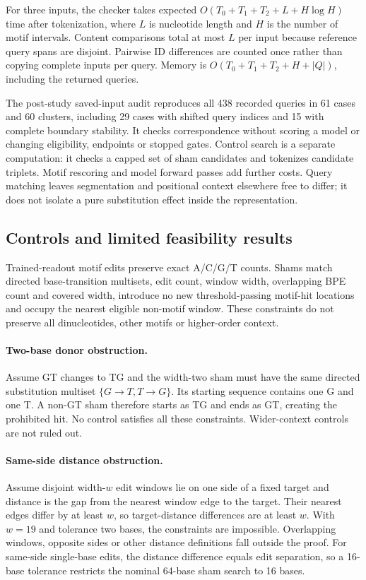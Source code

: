 \documentclass[10pt,letterpaper]{article}
\begin{document}
For three inputs, the checker takes expected $O(T_0+T_1+T_2+L+H\log H)$ time after tokenization, where $L$ is nucleotide length and $H$ is the number of motif intervals. Content comparisons total at most $L$ per input because reference query spans are disjoint. Pairwise ID differences are counted once rather than copying complete inputs per query. Memory is $O(T_0+T_1+T_2+H+|Q|)$, including the returned queries.

The post-study saved-input audit reproduces all 438 recorded queries in 61 cases and 60 clusters, including 29 cases with shifted query indices and 15 with complete boundary stability. It checks correspondence without scoring a model or changing eligibility, endpoints or stopped gates. Control search is a separate computation: it checks a capped set of sham candidates and tokenizes candidate triplets. Motif rescoring and model forward passes add further costs. Query matching leaves segmentation and positional context elsewhere free to differ; it does not isolate a pure substitution effect inside the representation.
\subsection{Controls and limited feasibility results}
Trained-readout motif edits preserve exact A/C/G/T counts. Shams match directed base-transition multisets, edit count, window width, overlapping BPE count and covered width, introduce no new threshold-passing motif-hit locations and occupy the nearest eligible non-motif window. These constraints do not preserve all dinucleotides, other motifs or higher-order context.

\paragraph{Two-base donor obstruction.}
Assume GT changes to TG and the width-two sham must have the same directed substitution multiset $\{G\!\to\!T,T\!\to\!G\}$. Its starting sequence contains one G and one T. A non-GT sham therefore starts as TG and ends as GT, creating the prohibited hit. No control satisfies all these constraints. Wider-context controls are not ruled out.

\paragraph{Same-side distance obstruction.}
Assume disjoint width-$w$ edit windows lie on one side of a fixed target and distance is the gap from the nearest window edge to the target. Their nearest edges differ by at least $w$, so target-distance differences are at least $w$. With $w=19$ and tolerance two bases, the constraints are impossible. Overlapping windows, opposite sides or other distance definitions fall outside the proof. For same-side single-base edits, the distance difference equals edit separation, so a 16-base tolerance restricts the nominal 64-base sham search to 16 bases.
\end{document}
